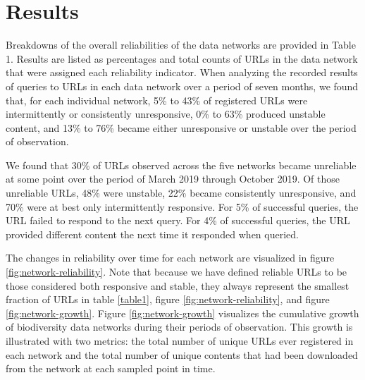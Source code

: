 % 



\section*{Results}
\label{sec:results}
Breakdowns of the overall reliabilities of the data networks are provided in Table 1. Results are listed as percentages and total counts of URLs in the data network that were assigned each reliability indicator. When analyzing the recorded results of queries to URLs in each data network over a period of seven months, we found that, for each individual network, 5\% to 43\% of registered URLs were intermittently or consistently unresponsive, 0\% to 63\% produced unstable content, and 13\% to 76\% became either unresponsive or unstable over the period of observation.

We found that 30\% of URLs observed across the five networks became unreliable at some point over the period of March 2019 through October 2019. Of those unreliable URLs, 48\% were unstable, 22\% became consistently unresponsive, and 70\% were at best only intermittently responsive. For 5\% of successful queries, the URL failed to respond to the next query. For 4\% of successful queries, the URL provided different content the next time it responded when queried.

The changes in reliability over time for each network are visualized in figure \ref{fig:network-reliability}. Note that because we have defined reliable URLs to be those considered both responsive and stable, they always represent the smallest fraction of URLs in table \ref{table1}, figure \ref{fig:network-reliability}, and figure \ref{fig:network-growth}. Figure \ref{fig:network-growth} visualizes the cumulative growth of biodiversity data networks during their periods of observation. This growth is illustrated with two metrics: the total number of unique URLs ever registered in each network and the total number of unique contents that had been downloaded from the network at each sampled point in time.

% 


% 

